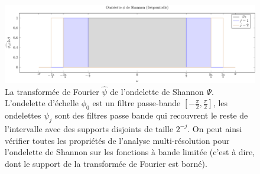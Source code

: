 \begin{figure}
	\includegraphics[width=17cm]{Figs/shannonfreq}
	\caption{La transformée de Fourier $\hat{\psi}$ de l'ondelette de Shannon $\Psi$. L'ondelette d'échelle $\phi_0$ est un filtre passe-bande $[-\frac{\pi}{2}, \frac{\pi}{2}]$, les ondelettes $ \psi_j$ sont des filtres passe bande qui recouvrent le reste de l'intervalle avec des supports disjoints de taille $2^{-j}$. On peut ainsi vérifier toutes les propriétés de l'analyse multi-résolution pour l'ondelette de Shannon sur les fonctions à bande limitée (c'est à dire, dont le support de la transformée de Fourier est borné).
	}
\end{figure}
